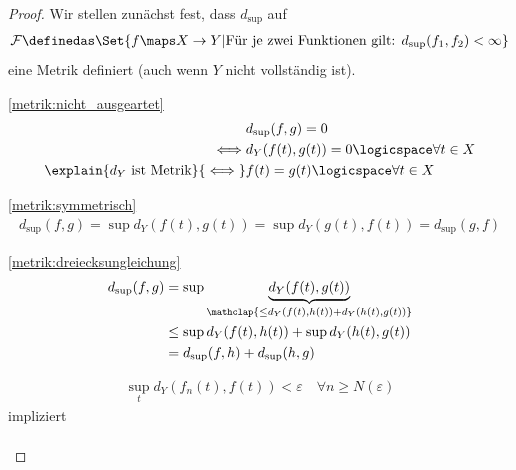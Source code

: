 \begin{lemma}
\begin{eigenschaftenenumerate}
        \begin{proof}
            Wir stellen zunächst fest, dass \( d_{\sup}\) auf
            \begin{align*}
                \mathcal{F}\definedas \Set{f \maps X\to Y|\text{Für je zwei Funktionen gilt: }d_{\sup}(f_1,f_2)<\infty}
            \end{align*} 
            eine Metrik definiert (auch wenn \( Y\) nicht vollständig ist).
            \begin{proofdescription}
                \item[\ref{metrik:nicht_ausgeartet}] \begin{align*}
                    &d_{\sup}(f,g)=0\\
                    \iff &d_{Y}(f(t),g(t))=0 \logicspace \forall t\in X\\
                    \explain{d_Y\text{ ist Metrik}}{\iff} &f(t)=g(t)\logicspace \forall t\in X
                \end{align*}
                \item[\ref{metrik:symmetrisch}]
                \begin{align*}
                    d_{\sup}(f,g)=\sup d_Y(f(t),g(t))=\sup d_Y(g(t),f(t))=d_{\sup}(g,f)
                \end{align*} 
                \item[\ref{metrik:dreiecksungleichung}] \begin{align*}
                    d_{\sup}(f,g)
                    \begin{aligned}[t]
                        &=\sup \underbrace{d_Y(f(t),g(t))}_{\mathclap{\leq d_Y(f(t),h(t))+d_Y(h(t),g(t))}}\\
                        &\leq \sup d_Y(f(t),h(t))+\sup d_Y(h(t),g(t))\\
                        &=d_{\sup} (f,h)+d_{\sup} (h,g)
                    \end{aligned}
                \end{align*}
            \end{proofdescription}
            \begin{proofdescription}
                \item[\hin] \begin{align*}
                    \sup_t d_Y(f_n(t),f(t))<\varepsilon\quad \forall n\geq N(\varepsilon)
                \end{align*}
                impliziert
                \begin{align*}

\end{align*}
\end{proofdescription}
\end{proof}
\end{eigenschaftenenumerate}
\end{lemma}
